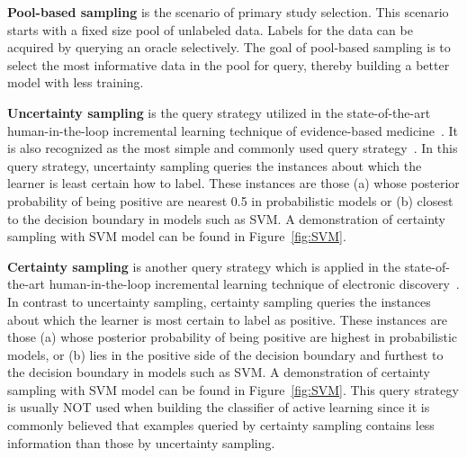 \documentclass[final,twocolumn,5p]{elsarticle}
\theoremstyle{break}
\begin{document}
\textbf{Pool-based sampling} is the scenario of primary study selection. This scenario starts with a fixed size pool of unlabeled data. Labels for the data can be acquired by querying an oracle selectively. The goal of pool-based sampling is to select the most informative data in the pool for query, thereby building a better model with less training.

\textbf{Uncertainty sampling} is the query strategy utilized in the state-of-the-art human-in-the-loop incremental learning technique of evidence-based medicine~\cite{wallace2010semi,wallace2010active}. It is also recognized as the most simple and commonly used query strategy~\cite{settles2010active}. In this query strategy, uncertainty sampling queries the instances about which the learner is least certain how to label. These instances are those (a) whose posterior probability of being positive are nearest 0.5 in probabilistic models or (b) closest to the decision boundary in models such as SVM. A demonstration of certainty sampling with SVM model can be found in Figure~\ref{fig:SVM}.

\textbf{Certainty sampling} is another query strategy which is applied in the state-of-the-art human-in-the-loop incremental learning technique of electronic discovery~\cite{cormack2014evaluation,cormack2015autonomy}. In contrast to uncertainty sampling, certainty sampling queries the instances about which the learner is most certain to label as positive. These instances are those (a) whose posterior probability of being positive are highest in probabilistic models, or (b) lies in the positive side of the decision boundary and furthest to the decision boundary in models such as SVM. A demonstration of certainty sampling with SVM model can be found in Figure~\ref{fig:SVM}. This query strategy is usually NOT used when building the classifier of active learning since it is commonly believed that examples queried by certainty sampling contains less information than those by uncertainty sampling.


\end{document}
